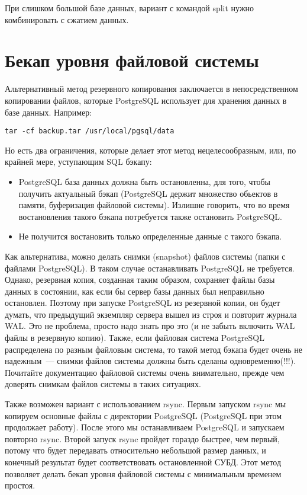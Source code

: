 При слишком большой базе данных, вариант с командой split нужно комбинировать с сжатием данных.


\section{Бекап уровня файловой системы}
Альтернативный метод резервного копирования заключается в непосредственном копировании файлов, 
которые PostgreSQL использует для хранения данных в базе данных. Например:
\begin{lstlisting}[label=lst:backups14,caption=Бэкап PostgreSQL файлов]
tar -cf backup.tar /usr/local/pgsql/data
\end{lstlisting}

Но есть два ограничения, которые делает этот метод нецелесообразным, или, по крайней мере, уступающим SQL бэкапу:
\begin{itemize}
\item PostgreSQL база данных должна быть остановленна, для того, чтобы получить актуальный бэкап 
(PostgreSQL держит множество обьектов в памяти, буферизация файловой системы). Излишне говорить, 
что во время востановления такого бэкапа потребуется также остановить PostgreSQL.
\item Не получится востановить только определенные данные с такого бэкапа.
\end{itemize}

Как альтернатива, можно делать снимки (snapshot) файлов системы (папки с файлами PostgreSQL). В таком случае останавливать PostgreSQL 
не требуется. Однако, резервная копия, созданная таким образом, сохраняет файлы базы данных в состоянии, как если бы сервер базы данных 
был неправильно остановлен. Поэтому при запуске PostgreSQL из резервной копии, он будет думать, что предыдущий экземпляр 
сервера вышел из строя и повторит журнала WAL. Это не проблема, просто надо знать про это (и не забыть включить WAL файлы 
в резервную копию). Также, если файловая система PostgreSQL распределена по разным файловым система, то такой метод бэкапа 
будет очень не надежным~--- снимки файлов системы должны быть сделаны одновременно(!!!). Почитайте документацию файловой 
системы очень внимательно, прежде чем доверять снимкам файлов системы в таких ситуациях.

Также возможен вариант с использованием rsync. Первым запуском rsync мы копируем основные файлы с директории PostgreSQL 
(PostgreSQL при этом продолжает работу). После этого 
мы останавливаем PostgreSQL и запускаем повторно rsync. Второй запуск rsync пройдет гораздо быстрее, чем первый, 
потому что будет передавать относительно небольшой размер данных, 
и конечный результат будет соответствовать остановленной СУБД. 
Этот метод позволяет делать бекап уровня файловой системы с минимальным временем простоя.

